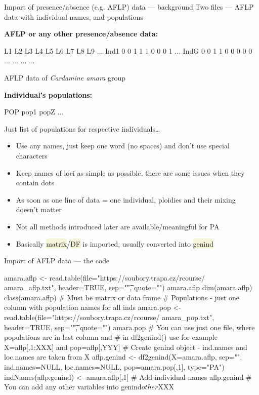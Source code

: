 \documentclass[compress, xelatex, 11pt, xcolor=svgnames, aspectratio=169,
	hyperref={
		bookmarks=true,
		unicode=true,
		colorlinks=true,
		pdftitle={Molecular data in R},
		plainpages=false,
		pdfauthor={Vojtech Zeisek},
		pdfsubject={Course about phylogeny and evolution in R},
		pdfcreator={XeLaTeX},
		pdfkeywords={R, evolution, phylogeny, molecular data},
		linkcolor=Crimson, %
		anchorcolor=Magenta, %
		citecolor=Magenta, %
		filecolor=Magenta, %
		menucolor=Magenta, %
		urlcolor=DodgerBlue, %
		},
	url={hyphens, lowtilde} %
	]{beamer}
\renewcommand{\texttt}[1]{\colorbox{Beige}{{\ttfamily #1}}}
\begin{document}
\begin{frame}[fragile]{Import of presence/absence (e.g. AFLP) data --- background}
	Two files --- AFLP data with individual names, and populations
	\vfill
	\begin{multicols}{2}
	\vfill
	\textbf{AFLP or any other presence/absence data:}
	\vfill
	\begin{spluscode}
        L1 L2 L3 L4 L5 L6 L7 L8 L9 ...
    Ind1 0  0  1  1  1  0  0  0  1 ...
    IndG 0  0  1  1  0  0  0  0  0 ...
     ...  ...                      ...
	\end{spluscode}
	\vfill
	\begin{footnotesize}
		AFLP data of \textit{Cardamine amara} group
	\end{footnotesize}
	\vfill
	\textbf{Individual's populations:}
	\vfill
	\begin{spluscode}
    POP
    pop1
    popZ
    ...
	\end{spluscode}
	\vfill
	\begin{footnotesize}
		Just list of populations for respective individuals\ldots
	\end{footnotesize}
	\columnbreak
	\begin{itemize}
		\item Use any names, just keep one word (no spaces) and don't use special characters
		\item Keep names of loci as simple as possible, there are some issues when they contain dots
		\item As soon as one line of data = one individual, ploidies and their mixing doesn't matter
		\item Not all methods introduced later are available/meaningful for PA
		\item Basically \texttt{matrix}/\texttt{DF} is imported, usually converted into \texttt{genind}
	\end{itemize}
	\end{multicols}
\end{frame}

\begin{frame}[fragile]{Import of AFLP data --- the code}
	\begin{spluscode}
    amara.aflp <- read.table(file="https://soubory.trapa.cz/rcourse/
      amara_aflp.txt", header=TRUE, sep="\t", quote="")
    amara.aflp
    dim(amara.aflp)
    class(amara.aflp) # Must be matrix or data frame
    # Populations - just one column with population names for all inds
    amara.pop <- read.table(file="https://soubory.trapa.cz/rcourse/
      amara_pop.txt", header=TRUE, sep="\t", quote="")
    amara.pop
    # You can use just one file, where populations are in last column and
    # in df2genind() use for example X=aflp[,1:XXX] and pop=aflp[,YYY]
    # Create genind object - ind.names and loc.names are taken from X
    aflp.genind <- df2genind(X=amara.aflp, sep="", ind.names=NULL,
      loc.names=NULL, pop=amara.pop[,1], type="PA")
    indNames(aflp.genind) <- amara.aflp[,1] # Add individual names
    aflp.genind
    # You can add any other variables into genind$other$XXX
	\end{spluscode}
\end{frame}
\end{document}
